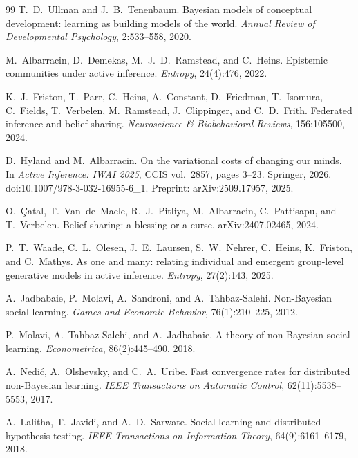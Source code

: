 \documentclass[runningheads]{llncs}
\begin{document}
\begin{thebibliography}{99}
T.~D.~Ullman and J.~B.~Tenenbaum.
Bayesian models of conceptual development: learning as building models of the world.
\emph{Annual Review of Developmental Psychology}, 2:533--558, 2020.

M.~Albarracin, D.~Demekas, M.~J.~D.~Ramstead, and C.~Heins.
Epistemic communities under active inference. \emph{Entropy}, 24(4):476, 2022.

K.~J.~Friston, T.~Parr, C.~Heins, A.~Constant, D.~Friedman, T.~Isomura, C.~Fields,
T.~Verbelen, M.~Ramstead, J.~Clippinger, and C.~D.~Frith.
Federated inference and belief sharing.
\emph{Neuroscience \& Biobehavioral Reviews}, 156:105500, 2024.

D.~Hyland and M.~Albarracin.
On the variational costs of changing our minds.
In \emph{Active Inference: IWAI 2025}, CCIS vol.~2857, pages 3--23.
Springer, 2026. doi:10.1007/978-3-032-16955-6\_1.
Preprint: arXiv:2509.17957, 2025.

O.~\c{C}atal, T.~Van~de~Maele, R.~J.~Pitliya, M.~Albarracin, C.~Pattisapu, and T.~Verbelen.
Belief sharing: a blessing or a curse. arXiv:2407.02465, 2024.

P.~T.~Waade, C.~L.~Olesen, J.~E.~Laursen, S.~W.~Nehrer, C.~Heins, K.~Friston, and C.~Mathys.
As one and many: relating individual and emergent group-level generative models in active inference.
\emph{Entropy}, 27(2):143, 2025.

A.~Jadbabaie, P.~Molavi, A.~Sandroni, and A.~Tahbaz-Salehi.
Non-Bayesian social learning. \emph{Games and Economic Behavior}, 76(1):210--225, 2012.

P.~Molavi, A.~Tahbaz-Salehi, and A.~Jadbabaie.
A theory of non-Bayesian social learning. \emph{Econometrica}, 86(2):445--490, 2018.

A.~Nedi\'c, A.~Olshevsky, and C.~A.~Uribe.
Fast convergence rates for distributed non-Bayesian learning.
\emph{IEEE Transactions on Automatic Control}, 62(11):5538--5553, 2017.

A.~Lalitha, T.~Javidi, and A.~D.~Sarwate.
Social learning and distributed hypothesis testing.
\emph{IEEE Transactions on Information Theory}, 64(9):6161--6179, 2018.


\end{thebibliography}
\end{document}
